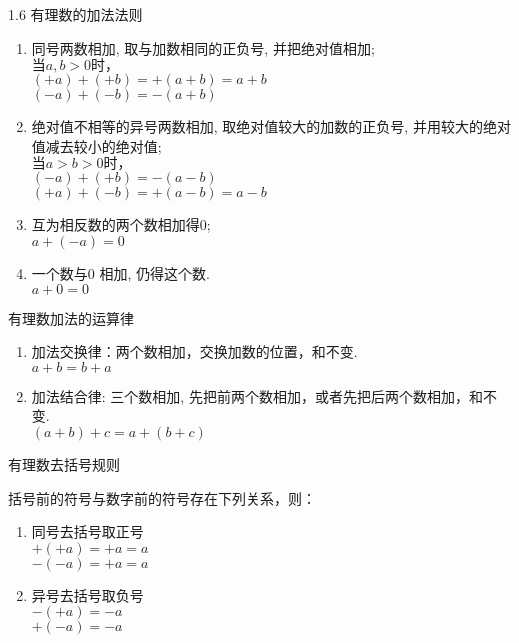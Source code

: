 \begin{frame}[t]{1.6 有理数的加法法则}
\begin{spacing}{1.1} %
\normalsize
\begin{enumerate}[label={\arabic*.}]
\item 同号两数相加, 取与加数相同的正负号, 并把绝对值相加; \\
$\text{当}a,b  > 0\text{时，}$ \\
$(+a) + (+b) = +(a+b) = a + b$ \\
$(-a) + (-b) = -(a+b)$ \\
\item 绝对值不相等的异号两数相加, 取绝对值较大的加数的正负号, 并用较大的绝对值减去较小的绝对值; \\
$\text{当}a > b > 0\text{时，}$ \\
$(-a) + (+b) = -(a-b)$ \\
$(+a) + (-b) = +(a-b) = a - b$ \\
\item 互为相反数的两个数相加得0; \\
 $a + (-a) = 0$ \\
\item 一个数与0 相加, 仍得这个数. \\
$a + 0 = 0 $\\
\end{enumerate}
\end{spacing}
\end{frame}

\begin{frame}[t]{有理数加法的运算律}
\begin{spacing}{1.5} %
\Large
\begin{enumerate}[label={\arabic*.}]
\item 加法交换律：两个数相加，交换加数的位置，和不变. \\
$a + b = b + a$
\item 加法结合律: 三个数相加, 先把前两个数相加，或者先把后两个数相加，和不变. \\
$(a + b) + c = a + (b + c)$
\end{enumerate}
\end{spacing}
\end{frame}

\begin{frame}[t]{有理数去括号规则}
\begin{spacing}{1.5} %
\Large
括号前的符号与数字前的符号存在下列关系，则：\\
\begin{enumerate}[label={\arabic*.}]
\item 同号去括号取正号 \\
$+(+a) = +a = a$ \\
$-(-a) = +a = a$ \\
\item 异号去括号取负号\\
$-(+a) = -a$ \\
$+(-a) = -a$ \\
\end{enumerate}
\end{spacing}
\end{frame}
